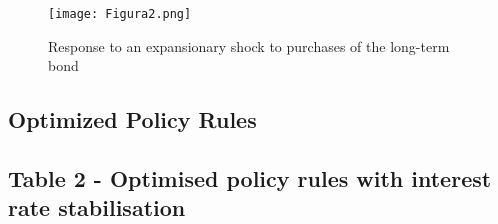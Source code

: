 \documentclass[12pt]{article}
\begin{document}
\begin{figure}[H]
    \centering
    \texttt{[image: Figura2.png]}
    \caption{Response to an expansionary shock to purchases of the long-term bond}
    \label{fig:enter-label}
\end{figure}












\subsection*{Optimized Policy Rules}


\subsection*{Table 2 - Optimised policy rules with interest rate stabilisation}
\end{document}

